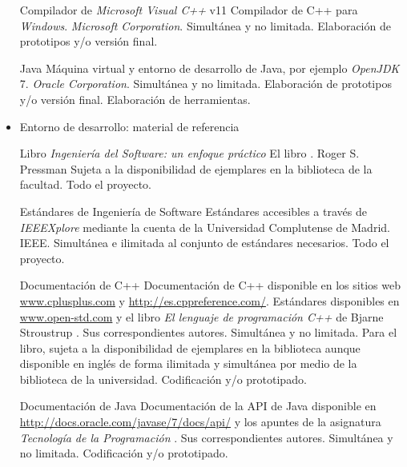 \begin{itemize}
		{Compilador de \textit{Microsoft Visual C++} v11}
		{Compilador de C++ para \textit{Windows}.}
		{\textit{Microsoft Corporation}.}
		{Simultánea y no limitada.}
		{Elaboración de prototipos y/o versión final.}

		{Java}
		{Máquina virtual y entorno de desarrollo de Java, por ejemplo \textit{OpenJDK} 7.}
		{\textit{Oracle Corporation}.}
		{Simultánea y no limitada.}
		{Elaboración de prototipos y/o versión final. Elaboración de herramientas.}

		
	\item Entorno de desarrollo: material de referencia

		{Libro \textit{Ingeniería del Software: un enfoque práctico}}
		{El libro \cite{PSMAN}.}
		{Roger S. Pressman}
		{Sujeta a la disponibilidad de ejemplares en la biblioteca de la facultad.}
		{Todo el proyecto.}

		{Estándares de Ingeniería de Software}
		{Estándares accesibles a través de \textit{IEEEXplore\marcaregistrada} mediante la cuenta de la Universidad Complutense de Madrid.}
		{IEEE.}
		{Simultánea e ilimitada al conjunto de estándares necesarios.}
		{Todo el proyecto.}

		{Documentación de C++}
		{Documentación de C++ disponible en los sitios web \url{www.cplusplus.com} y \url{http://es.cppreference.com/}. Estándares disponibles en \url{www.open-std.com} y el libro \emph{El lenguaje de programación C++} de Bjarne Stroustrup \cite{STROUSTRUP}.}
		{Sus correspondientes autores.}
		{Simultánea y no limitada. Para el libro, sujeta a la disponibilidad de ejemplares en la biblioteca aunque disponible
		en inglés de forma ilimitada y simultánea por medio de la biblioteca de la universidad.}
		{Codificación y/o prototipado.}

		{Documentación de Java}
		{Documentación de la API de Java disponible en \url{http://docs.oracle.com/javase/7/docs/api/} y los apuntes de la asignatura \textit{Tecnología de la Programación} \cite{AP_TP}.}
		{Sus correspondientes autores.}
		{Simultánea y no limitada.}
		{Codificación y/o prototipado.}
\end{itemize}

